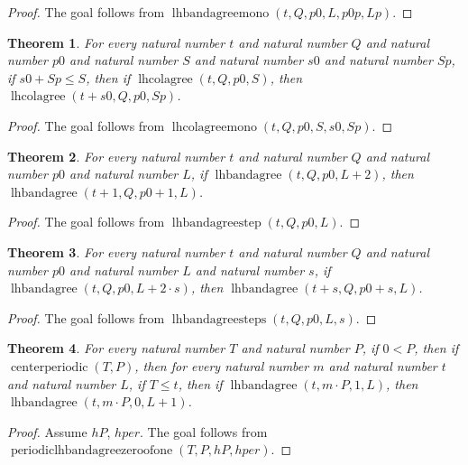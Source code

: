 \documentclass[11pt]{article}
\newtheorem{theorem}{Theorem}[section]
\theoremstyle{definition}
\begin{document}
\begin{proof}
The goal follows from \(\operatorname{lhbandagreemono}(t, Q, p0, L, p0p, Lp)\).
\end{proof}
\begin{theorem}
\label{ll:paper:lhcolagree-mono}
For every natural number \(t\) and natural number \(Q\) and natural number \(p0\) and natural number \(S\) and natural number \(s0\) and natural number \(Sp\), if \(s0 + Sp \le S\), then if \(\operatorname{lhcolagree}(t, Q, p0, S)\), then \(\operatorname{lhcolagree}(t + s0, Q, p0, Sp)\).
\end{theorem}
\begin{proof}
The goal follows from \(\operatorname{lhcolagreemono}(t, Q, p0, S, s0, Sp)\).
\end{proof}
\begin{theorem}
\label{ll:paper:lhbandagree-step}
For every natural number \(t\) and natural number \(Q\) and natural number \(p0\) and natural number \(L\), if \(\operatorname{lhbandagree}(t, Q, p0, L + 2)\), then \(\operatorname{lhbandagree}(t + 1, Q, p0 + 1, L)\).
\end{theorem}
\begin{proof}
The goal follows from \(\operatorname{lhbandagreestep}(t, Q, p0, L)\).
\end{proof}
\begin{theorem}
\label{ll:paper:lhbandagree-steps}
For every natural number \(t\) and natural number \(Q\) and natural number \(p0\) and natural number \(L\) and natural number \(s\), if \(\operatorname{lhbandagree}(t, Q, p0, L + 2 \cdot s)\), then \(\operatorname{lhbandagree}(t + s, Q, p0 + s, L)\).
\end{theorem}
\begin{proof}
The goal follows from \(\operatorname{lhbandagreesteps}(t, Q, p0, L, s)\).
\end{proof}
\begin{theorem}
\label{ll:paper:periodic-lhbandagree-zero-of-one}
For every natural number \(T\) and natural number \(P\), if \(0 < P\), then if \(\operatorname{centerperiodic}(T, P)\), then for every natural number \(m\) and natural number \(t\) and natural number \(L\), if \(T \le t\), then if \(\operatorname{lhbandagree}(t, m \cdot P, 1, L)\), then \(\operatorname{lhbandagree}(t, m \cdot P, 0, L + 1)\).
\end{theorem}
\begin{proof}
Assume \(hP\), \(hper\).
The goal follows from \(\operatorname{periodiclhbandagreezeroofone}(T, P, hP, hper)\).
\end{proof}
\end{document}
